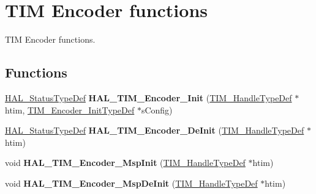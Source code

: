 \hypertarget{group___t_i_m___exported___functions___group6}{}\section{T\+IM Encoder functions}
\label{group___t_i_m___exported___functions___group6}


T\+IM Encoder functions.  


\subsection*{Functions}
\begin{DoxyCompactItemize}
\item 
\mbox{\label{group___t_i_m___exported___functions___group6_ga16beb79937c32f993bbc4fdc1e492c52}} 
\hyperlink{stm32f4xx__hal__def_8h_a63c0679d1cb8b8c684fbb0632743478f}{H\+A\+L\+\_\+\+Status\+Type\+Def} {\bfseries H\+A\+L\+\_\+\+T\+I\+M\+\_\+\+Encoder\+\_\+\+Init} (\hyperlink{struct_t_i_m___handle_type_def}{T\+I\+M\+\_\+\+Handle\+Type\+Def} $\ast$htim, \hyperlink{struct_t_i_m___encoder___init_type_def}{T\+I\+M\+\_\+\+Encoder\+\_\+\+Init\+Type\+Def} $\ast$s\+Config)
\item 
\mbox{\label{group___t_i_m___exported___functions___group6_gaaf99281fd7635e20c08e48bfc9ea11e3}} 
\hyperlink{stm32f4xx__hal__def_8h_a63c0679d1cb8b8c684fbb0632743478f}{H\+A\+L\+\_\+\+Status\+Type\+Def} {\bfseries H\+A\+L\+\_\+\+T\+I\+M\+\_\+\+Encoder\+\_\+\+De\+Init} (\hyperlink{struct_t_i_m___handle_type_def}{T\+I\+M\+\_\+\+Handle\+Type\+Def} $\ast$htim)
\item 
\mbox{\label{group___t_i_m___exported___functions___group6_ga1a8e1103bfcc56c2626ed5cf546391d1}} 
void {\bfseries H\+A\+L\+\_\+\+T\+I\+M\+\_\+\+Encoder\+\_\+\+Msp\+Init} (\hyperlink{struct_t_i_m___handle_type_def}{T\+I\+M\+\_\+\+Handle\+Type\+Def} $\ast$htim)
\item 
\mbox{\label{group___t_i_m___exported___functions___group6_ga77c8216735a5b1374ea948737eed8a18}} 
void {\bfseries H\+A\+L\+\_\+\+T\+I\+M\+\_\+\+Encoder\+\_\+\+Msp\+De\+Init} (\hyperlink{struct_t_i_m___handle_type_def}{T\+I\+M\+\_\+\+Handle\+Type\+Def} $\ast$htim)

\end{DoxyCompactItemize}
